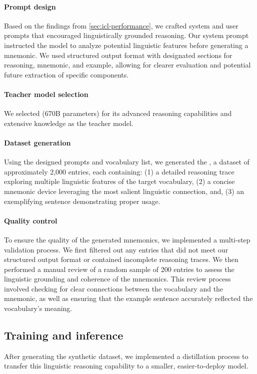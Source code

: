\paragraph{Prompt design} Based on the findings from \cref{sec:icl-performance}, we crafted system and user prompts that encouraged linguistically grounded reasoning. Our system prompt instructed the model to analyze potential linguistic features before generating a mnemonic. We used structured output format with designated sections for reasoning, mnemonic, and example, allowing for clearer evaluation and potential future extraction of specific components.

\paragraph{Teacher model selection} We selected \teachermodel (670B parameters) \citep{DeepSeek-AIDEEPSEEKR12025} for its advanced reasoning capabilities and extensive knowledge as the teacher model.

\paragraph{Dataset generation} Using the designed prompts and vocabulary list, we generated the \links, a dataset of approximately 2,000 entries, each containing: (1) a detailed reasoning trace exploring multiple linguistic features of the target vocabulary, (2) a concise mnemonic device leveraging the most salient linguistic connection, and, (3) an exemplifying sentence demonstrating proper usage.

\paragraph{Quality control} To ensure the quality of the generated mnemonics, we implemented a multi-step validation process. We first filtered out any entries that did not meet our structured output format or contained incomplete reasoning traces. We then performed a manual review of a random sample of 200 entries to assess the linguistic grounding and coherence of the mnemonics. This review process involved checking for clear connections between the vocabulary and the mnemonic, as well as ensuring that the example sentence accurately reflected the vocabulary's meaning.

\subsection{Training and inference} \label{sec:training-inference}
After generating the synthetic dataset, we implemented a distillation process to transfer this linguistic reasoning capability to a smaller, easier-to-deploy model.

